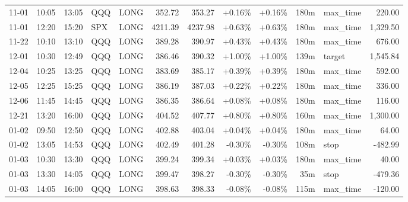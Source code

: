 \documentclass[11pt,a4paper]{article}
\begin{document}
\begin{center}
\begin{longtable}{>{\color{txtmain}}l l l l l r r r r r >{\color{txtmain}}l r}
11-01 & 10:05 & 13:05 & QQQ & LONG & 352.72 & 353.27 & \textcolor{wingreen}{+0.16\%} & \textcolor{wingreen}{+0.16\%} & 180m & max\_time & \textcolor{wingreen}{220.00} \\
11-01 & 12:20 & 15:20 & SPX & LONG & 4211.39 & 4237.98 & \textcolor{wingreen}{+0.63\%} & \textcolor{wingreen}{+0.63\%} & 180m & max\_time & \textcolor{wingreen}{1,329.50} \\
11-22 & 10:10 & 13:10 & QQQ & LONG & 389.28 & 390.97 & \textcolor{wingreen}{+0.43\%} & \textcolor{wingreen}{+0.43\%} & 180m & max\_time & \textcolor{wingreen}{676.00} \\
12-01 & 10:30 & 12:49 & QQQ & LONG & 386.46 & 390.32 & \textcolor{wingreen}{+1.00\%} & \textcolor{wingreen}{+1.00\%} & 139m & target & \textcolor{wingreen}{1,545.84} \\
12-04 & 10:25 & 13:25 & QQQ & LONG & 383.69 & 385.17 & \textcolor{wingreen}{+0.39\%} & \textcolor{wingreen}{+0.39\%} & 180m & max\_time & \textcolor{wingreen}{592.00} \\
12-05 & 12:25 & 15:25 & QQQ & LONG & 386.19 & 387.03 & \textcolor{wingreen}{+0.22\%} & \textcolor{wingreen}{+0.22\%} & 180m & max\_time & \textcolor{wingreen}{336.00} \\
12-06 & 11:45 & 14:45 & QQQ & LONG & 386.35 & 386.64 & \textcolor{wingreen}{+0.08\%} & \textcolor{wingreen}{+0.08\%} & 180m & max\_time & \textcolor{wingreen}{116.00} \\
12-21 & 13:20 & 16:00 & QQQ & LONG & 404.52 & 407.77 & \textcolor{wingreen}{+0.80\%} & \textcolor{wingreen}{+0.80\%} & 160m & max\_time & \textcolor{wingreen}{1,300.00} \\
01-02 & 09:50 & 12:50 & QQQ & LONG & 402.88 & 403.04 & \textcolor{wingreen}{+0.04\%} & \textcolor{wingreen}{+0.04\%} & 180m & max\_time & \textcolor{wingreen}{64.00} \\
01-02 & 13:05 & 14:53 & QQQ & LONG & 402.49 & 401.28 & \textcolor{lossred}{-0.30\%} & \textcolor{lossred}{-0.30\%} & 108m & stop & \textcolor{lossred}{-482.99} \\
01-03 & 10:30 & 13:30 & QQQ & LONG & 399.24 & 399.34 & \textcolor{wingreen}{+0.03\%} & \textcolor{wingreen}{+0.03\%} & 180m & max\_time & \textcolor{wingreen}{40.00} \\
01-03 & 13:30 & 14:05 & QQQ & LONG & 399.47 & 398.27 & \textcolor{lossred}{-0.30\%} & \textcolor{lossred}{-0.30\%} & 35m & stop & \textcolor{lossred}{-479.36} \\
01-03 & 14:05 & 16:00 & QQQ & LONG & 398.63 & 398.33 & \textcolor{lossred}{-0.08\%} & \textcolor{lossred}{-0.08\%} & 115m & max\_time & \textcolor{lossred}{-120.00} \\

\end{longtable}
\end{center}
\end{document}
